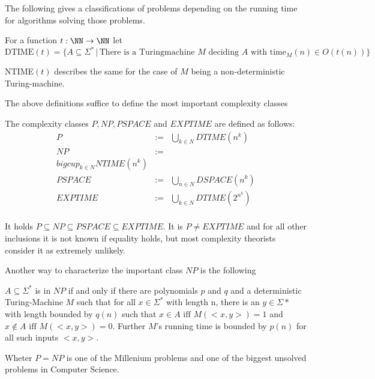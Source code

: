       The following gives a classifications of problems depending on the
      running time for algorithms solving those problems.
		\begin{definition}
			For a function $t: \NN \to \NN$ let 
      $$ \text{DTIME}(t) = \{ A \subseteq \Sigma^* \,|\, \text{There is a
      Turingmachine } M \text{ deciding } A \text{ with time}_M(n) \in O(t(n)) \} $$

      NTIME$(t)$ describes the same for the case of $M$ being a
      non-deterministic Turing-machine.
		\end{definition}
		The above definitions suffice to define the most important complexity classes
		\begin{definition}
			The complexity classes $P, NP, PSPACE$ and $EXPTIME$ are defined as follows:
			\begin{eqnarray*}
				P & := & \bigcup_{k \in N} DTIME(n^k) \\
				NP & := & \\bigcup_{k \in N} NTIME(n^k) \\
				PSPACE & := & \bigcup_{n \in N} DSPACE(n^k) \\
				EXPTIME & := & \bigcup_{k \in N} DTIME(2^{n^k}) \\
			\end{eqnarray*}
		\end{definition}
		It holds $P \subseteq NP \subseteq PSPACE \subseteq EXPTIME$. 
		It is $P \neq EXPTIME$ and for all other inclusions it is not known if equality holds, but most 
		complexity theorists consider it as extremely unlikely.

    Another way to characterize the important class $NP$ is the following
    \begin{theorem}
      $A \subseteq \Sigma^*$ is in $NP$ if and only if there are polynomials
      $p$ and $q$ and a deterministic Turing-Machine $M$ such that for all $x
      \in \Sigma^*$ with length n, there is an $y \in \Sigma*$ with length
      bounded by $q(n)$ such that $x \in A \text{ iff } M(<x,y>) = 1$ and 
      $x \not \in A \text{ iff } M(<x,y>) = 0$. 
      Further $M$'s running time is bounded by $p(n)$ for all such inputs
      $<x,y>$.  
    \end{theorem}
		Wheter $P = NP$ is one of the Millenium problems and one of the biggest unsolved problems in Computer Science.

